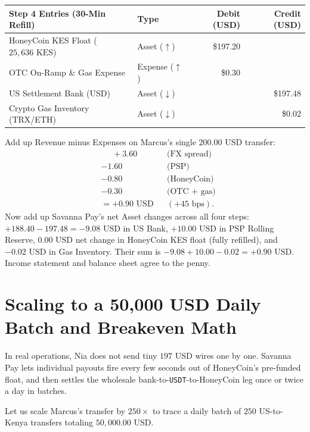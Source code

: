 \begin{center}
\small
\begin{tabular}{llrr}
\toprule
\textbf{Step 4 Entries (30-Min Refill)} & \textbf{Type} & \textbf{Debit (USD)} & \textbf{Credit (USD)} \\
\midrule
HoneyCoin KES Float ($25{,}636\text{ KES}$) & Asset ($\uparrow$) & \$197.20 & \\
OTC On-Ramp \& Gas Expense & Expense ($\uparrow$) & \$0.30 & \\
US Settlement Bank (USD) & Asset ($\downarrow$) & & \$197.48 \\
Crypto Gas Inventory (TRX/ETH) & Asset ($\downarrow$) & & \$0.02 \\
\bottomrule
\end{tabular}
\end{center}

Add up Revenue minus Expenses on Marcus's single $200.00\text{ USD}$ transfer:
\begin{align*}
  &\phantom{{}={}} +3.60 &&\text{(FX spread)} \\
  &- 1.60 &&\text{(PSP)} \\
  &- 0.80 &&\text{(HoneyCoin)} \\
  &- 0.30 &&\text{(OTC + gas)} \\
  &= +0.90\text{ USD} &&(+45\text{ bps}).
\end{align*}
Now add up Savanna Pay's net Asset changes across all four steps: $+188.40 - 197.48 = -9.08\text{ USD}$ in US Bank, $+10.00\text{ USD}$ in PSP Rolling Reserve, $0.00\text{ USD}$ net change in HoneyCoin KES float (fully refilled), and $-0.02\text{ USD}$ in Gas Inventory. Their sum is $-9.08 + 10.00 - 0.02 = +0.90\text{ USD}$. Income statement and balance sheet agree to the penny.

\section{Scaling to a 50,000 USD Daily Batch and Breakeven Math}

In real operations, Nia does not send tiny $197\text{ USD}$ wires one by one. Savanna Pay lets individual payouts fire every few seconds out of HoneyCoin's pre-funded float, and then settles the wholesale bank-to-\texttt{USDT}-to-HoneyCoin leg once or twice a day in batches.

Let us scale Marcus's transfer by $250\times$ to trace a daily batch of $250$ US-to-Kenya transfers totaling $50{,}000.00\text{ USD}$.

